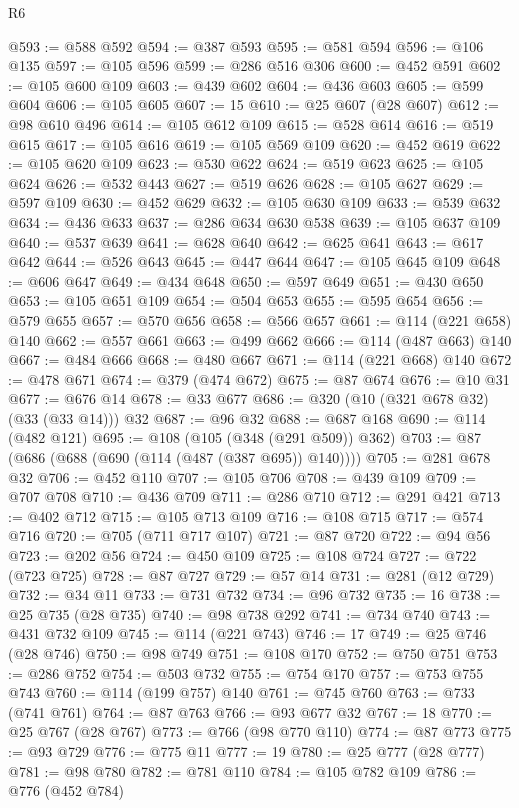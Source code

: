\begin{lexlean}{R6}
\begin{coremodule}
@593 := @588 @592
@594 := @387 @593
@595 := @581 @594
@596 := @106 @135
@597 := @105 @596
@599 := @286 @516 @306
@600 := @452 @591
@602 := @105 @600 @109
@603 := @439 @602
@604 := @436 @603
@605 := @599 @604
@606 := @105 @605
@607 := 15
@610 := @25 @607 (@28 @607)
@612 := @98 @610 @496
@614 := @105 @612 @109
@615 := @528 @614
@616 := @519 @615
@617 := @105 @616
@619 := @105 @569 @109
@620 := @452 @619
@622 := @105 @620 @109
@623 := @530 @622
@624 := @519 @623
@625 := @105 @624
@626 := @532 @443
@627 := @519 @626
@628 := @105 @627
@629 := @597 @109
@630 := @452 @629
@632 := @105 @630 @109
@633 := @539 @632
@634 := @436 @633
@637 := @286 @634 @630 @538
@639 := @105 @637 @109
@640 := @537 @639
@641 := @628 @640
@642 := @625 @641
@643 := @617 @642
@644 := @526 @643
@645 := @447 @644
@647 := @105 @645 @109
@648 := @606 @647
@649 := @434 @648
@650 := @597 @649
@651 := @430 @650
@653 := @105 @651 @109
@654 := @504 @653
@655 := @595 @654
@656 := @579 @655
@657 := @570 @656
@658 := @566 @657
@661 := @114 (@221 @658) @140
@662 := @557 @661
@663 := @499 @662
@666 := @114 (@487 @663) @140
@667 := @484 @666
@668 := @480 @667
@671 := @114 (@221 @668) @140
@672 := @478 @671
@674 := @379 (@474 @672)
@675 := @87 @674
@676 := @10 @31
@677 := @676 @14
@678 := @33 @677
@686 := @320 (@10 (@321 @678 @32) (@33 (@33 @14))) @32
@687 := @96 @32
@688 := @687 @168
@690 := @114 (@482 @121)
@695 := @108 (@105 (@348 (@291 @509)) @362)
@703 := @87 (@686 (@688 (@690 (@114 (@487 (@387 @695)) @140))))
@705 := @281 @678 @32
@706 := @452 @110
@707 := @105 @706
@708 := @439 @109
@709 := @707 @708
@710 := @436 @709
@711 := @286 @710
@712 := @291 @421
@713 := @402 @712
@715 := @105 @713 @109
@716 := @108 @715
@717 := @574 @716
@720 := @705 (@711 @717 @107)
@721 := @87 @720
@722 := @94 @56
@723 := @202 @56
@724 := @450 @109
@725 := @108 @724
@727 := @722 (@723 @725)
@728 := @87 @727
@729 := @57 @14
@731 := @281 (@12 @729)
@732 := @34 @11
@733 := @731 @732
@734 := @96 @732
@735 := 16
@738 := @25 @735 (@28 @735)
@740 := @98 @738 @292
@741 := @734 @740
@743 := @431 @732 @109
@745 := @114 (@221 @743)
@746 := 17
@749 := @25 @746 (@28 @746)
@750 := @98 @749
@751 := @108 @170
@752 := @750 @751
@753 := @286 @752
@754 := @503 @732
@755 := @754 @170
@757 := @753 @755 @743
@760 := @114 (@199 @757) @140
@761 := @745 @760
@763 := @733 (@741 @761)
@764 := @87 @763
@766 := @93 @677 @32
@767 := 18
@770 := @25 @767 (@28 @767)
@773 := @766 (@98 @770 @110)
@774 := @87 @773
@775 := @93 @729
@776 := @775 @11
@777 := 19
@780 := @25 @777 (@28 @777)
@781 := @98 @780
@782 := @781 @110
@784 := @105 @782 @109
@786 := @776 (@452 @784)

\end{coremodule}
\end{lexlean}
